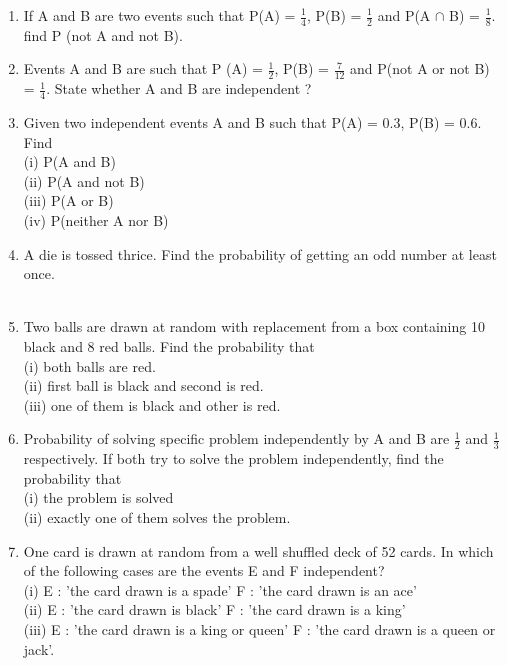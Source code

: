 \begin{enumerate}[label=\arabic*.,ref=\thesubsection.\theenumi]
\item If A and B are two events such that P(A) = $\frac{1}{4}$, P(B) = $\frac{1}{2}$ and P(A $\cap$ B) = $\frac{1}{8}$. find P (not A and not B).\\

\item Events A and B are such that P (A) = $\frac{1}{2}$, P(B) = $\frac{7}{12}$ and P(not A or not B) = $\frac{1}{4}$. State whether A and B are independent ?\\

\item Given two independent events A and B such that P(A) = 0.3, P(B) = 0.6. Find\\
(i) P(A and B)\\
(ii) P(A and not B)\\
(iii) P(A or B)\\
(iv) P(neither A nor B)\\

\item A die is tossed thrice. Find the probability of getting an odd number at least once.\\
\\
\solution


\item Two balls are drawn at random with replacement from a box containing 10 black and 8 red balls. Find the probability that\\
(i) both balls are red.\\
(ii) first ball is black and second is red.\\
(iii) one of them is black and other is red.\\
\solution


\item Probability of solving specific problem independently by A and B are $\frac{1}{2}$
and $\frac{1}{3}$ respectively. If both try to solve the problem independently, find the probability that\\
(i) the problem is solved \\
(ii) exactly one of them solves the problem.\\
\solution


\item One card is drawn at random from a well shuffled deck of 52 cards. In which of the following cases are the events E and F independent?\\
(i) E : 'the card drawn is a spade'
F : 'the card drawn is an ace'\\
(ii) E : 'the card drawn is black'
F : 'the card drawn is a king'\\
(iii) E : 'the card drawn is a king or queen'
F : 'the card drawn is a queen or jack'.\\
\solution



\end{enumerate}
